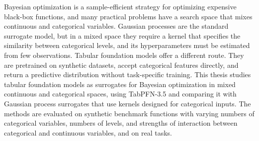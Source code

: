 
%

\begin{abstract}

貝氏最佳化是針對評估成本高昂的黑盒函數所發展的高樣本效率最佳化策略，許多實際問題的搜尋空間同時包含連續與類別變數。高斯過程是標準的代理模型，但在混合空間中，它需要以核函數指定類別水準之間的相似度，且核函數的超參數必須從少量觀測中估計。表格基礎模型提供了不同的途徑：它在合成資料集上預訓練，可以直接接受類別特徵，並且不需針對任務另行訓練即可輸出預測分佈。本論文研究表格基礎模型作為混合連續與類別變數空間貝氏最佳化之代理模型，以 TabPFN-3.5 為對象，並與搭配專為類別輸入設計之核函數的高斯過程代理模型比較。方法在合成基準函數上評估，其中類別變數個數、水準數，以及類別與連續變數之間交互作用的強度皆有變化，並在真實任務上評估。

\end{abstract}

\begin{abstract*}

Bayesian optimization is a sample-efficient strategy for optimizing expensive black-box functions, and many practical problems have a search space that mixes continuous and categorical variables. Gaussian processes are the standard surrogate model, but in a mixed space they require a kernel that specifies the similarity between categorical levels, and its hyperparameters must be estimated from few observations. Tabular foundation models offer a different route. They are pretrained on synthetic datasets, accept categorical features directly, and return a predictive distribution without task-specific training. This thesis studies tabular foundation models as surrogates for Bayesian optimization in mixed continuous and categorical spaces, using TabPFN-3.5 and comparing it with Gaussian process surrogates that use kernels designed for categorical inputs. The methods are evaluated on synthetic benchmark functions with varying numbers of categorical variables, numbers of levels, and strengths of interaction between categorical and continuous variables, and on real tasks.

\end{abstract*}
